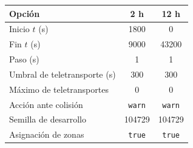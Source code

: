 \begin{tabular}{@{}lcc@{}}\hline
Opción & 2 h & 12 h \\ \hline
Inicio $t$ (s) & 1800 & 0 \\
Fin $t$ (s) & 9000 & 43200 \\
Paso (s) & 1 & 1 \\
Umbral de teletransporte (s) & 300 & 300 \\
Máximo de teletransportes & 0 & 0 \\
Acción ante colisión & \texttt{warn} & \texttt{warn} \\
Semilla de desarrollo & 104729 & 104729 \\
Asignación de zonas & \texttt{true} & \texttt{true} \\
\hline\end{tabular}
